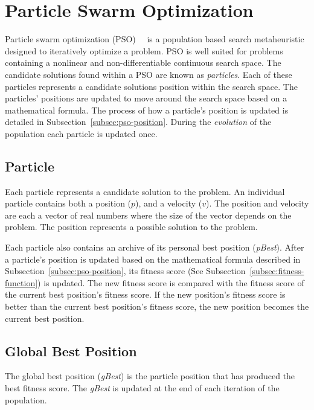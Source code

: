 \section{Particle Swarm Optimization}
\label{sec:pso}

Particle swarm optimization (PSO)~\cite{kennedy2010particle}~\cite{poli2007particle} is a population based search metaheuristic designed to iteratively optimize a problem. PSO is well suited for problems containing a nonlinear and non-differentiable continuous search space. The candidate solutions found within a PSO are known as \textit{particles}. Each of these particles represents a candidate solutions position within the search space. The particles' positions are updated to move around the search space based on a mathematical formula. The process of how a particle's position is updated is detailed in Subsection~\ref{subsec:pso-position}. During the \textit{evolution} of the population each particle is updated once.

\subsection{Particle}

Each particle represents a candidate solution to the problem. An individual particle contains both a position ($p$), and a velocity ($v$). The position and velocity are each a vector of real numbers where the size of the vector depends on the problem. The position represents a possible solution to the problem.

Each particle also contains an archive of its personal best position (\textit{pBest}). After a particle's position is updated based on the mathematical formula described in Subsection~\ref{subsec:pso-position}, its fitness score (See Subsection~\ref{subsec:fitness-function}) is updated. The new fitness score is compared with the fitness score of the current best position's fitness score. If the new position's fitness score is better than the current best position's fitness score, the new position becomes the current best position.

\subsection{Global Best Position}

The global best position (\textit{gBest}) is the particle position that has produced the best fitness score. The \textit{gBest} is updated at the end of each iteration of the population.

